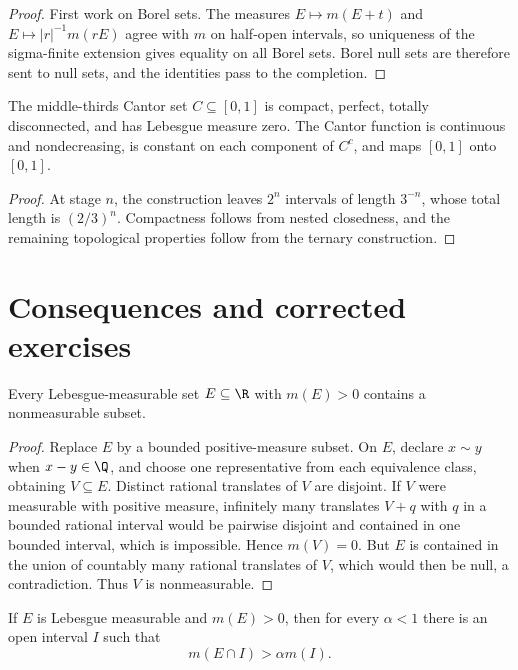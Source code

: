 \begin{proof}
First work on Borel sets. The measures $E\mapsto m(E+t)$ and $E\mapsto |r|^{-1}m(rE)$ agree with $m$ on half-open intervals, so uniqueness of the sigma-finite extension gives equality on all Borel sets. Borel null sets are therefore sent to null sets, and the identities pass to the completion.
\end{proof}

\begin{prop}
The middle-thirds Cantor set $C\subseteq[0,1]$ is compact, perfect, totally disconnected, and has Lebesgue measure zero. The Cantor function is continuous and nondecreasing, is constant on each component of $C^c$, and maps $[0,1]$ onto $[0,1]$.
\end{prop}

\begin{proof}
At stage $n$, the construction leaves $2^n$ intervals of length $3^{-n}$, whose total length is $(2/3)^n$. Compactness follows from nested closedness, and the remaining topological properties follow from the ternary construction.
\end{proof}

\section{Consequences and corrected exercises}

\begin{thm}
Every Lebesgue-measurable set $E\subseteq\R$ with $m(E)>0$ contains a nonmeasurable subset.
\end{thm}

\begin{proof}
Replace $E$ by a bounded positive-measure subset. On $E$, declare $x\sim y$ when $x-y\in\Q$, and choose one representative from each equivalence class, obtaining $V\subseteq E$. Distinct rational translates of $V$ are disjoint. If $V$ were measurable with positive measure, infinitely many translates $V+q$ with $q$ in a bounded rational interval would be pairwise disjoint and contained in one bounded interval, which is impossible. Hence $m(V)=0$. But $E$ is contained in the union of countably many rational translates of $V$, which would then be null, a contradiction. Thus $V$ is nonmeasurable.
\end{proof}

\begin{prop}
If $E$ is Lebesgue measurable and $m(E)>0$, then for every $\alpha<1$ there is an open interval $I$ such that
\[
m(E\cap I)>\alpha m(I).
\]
\end{prop}

